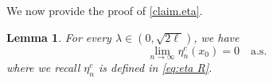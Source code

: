 \documentclass[12pt,reqno]{amsart}
\newtheorem{lemma}[theorem]{Lemma}
\theoremstyle{remark}
\newcommand{\1}{\mathbf{1}}
\begin{document}
	We now provide the proof of \eqref{claim.eta}.
		\begin{lemma}\label{lem:H1}
			For every $\lambda\in(0,\sqrt{2\ell})$, we have
			\begin{equation}\label{eq: eta goto 0 a.s.}
				\lim_{n \to \infty}\eta_n^c(x_0) = 0 \quad \mathrm{a.s.}
			\end{equation}
			where we recall $\eta_n^c$ is defined in \eqref{eq:eta R}.
		\end{lemma}
				

\end{document}
